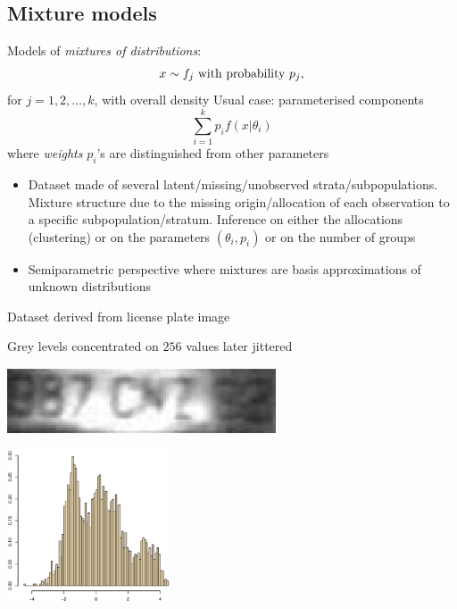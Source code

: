 \subsection{Mixture models}\begin{slide}

Models of {\it mixtures of distributions}:
$$
x \sim f_{j} \hbox{ with probability }p_{j},
$$
for $j=1, 2, \ldots, k$, with overall density
\pause
Usual case: parameterised components
$$
\sum_{i=1}^k p_i f(x|\theta_i)
$$
where {\em weights} $p_i$'s are distinguished from other parameters

\end{slide}\begin{slide}

\begin{itemize}
\item  Dataset made of several latent/missing/unobserved strata/subpopulations. 
Mixture structure due to the missing origin/allocation of each observation
to a specific subpopulation/stratum. Inference on either the allocations (clustering)
or on the parameters $(\theta_i,p_i)$ or on the number of groups
\vss\pause
\item  Semiparametric perspective where mixtures are basis
approximations of unknown distributions
\end{itemize}
\end{slide}\begin{slide}

Dataset derived from license plate image

Grey levels concentrated on $256$ values later jittered

\vs
\centerline{\includegraphics[width=8cm]{figures/plate.eps}}
\centerline{\includegraphics[height=4.5cm]{figures/plaque.hist.eps}}


\end{slide}
